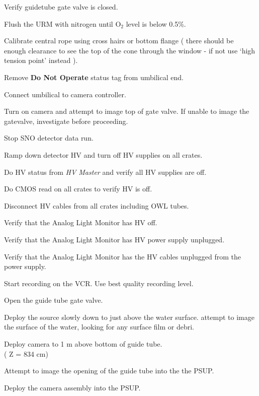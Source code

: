 \begin{enumerate}

\checkitem Verify guidetube gate valve is closed.

\checkitem Flush the URM with nitrogen until O$_2$ level is below
  0.5\%.

\checkitem Calibrate central rope using cross hairs or bottom flange
           ( there should be enough clearance to see the top of the
           cone through the window - if not use `high tension point'
           instead ).

\checkitem Remove {\bf Do Not Operate} status tag from umbilical end.

\checkitem Connect umbilical to camera controller.

\checkitem Turn on camera and attempt to image top of gate valve.  If unable
  to image the gatevalve, investigate before proceeding.

\checkitem Stop SNO detector data run.

\checkitem Ramp down detector HV and turn off HV supplies on all 
  crates.

\checkitem Do HV status from {\em HV Master} and verify all HV supplies
  are off.

\checkitem Do CMOS read on all crates to verify HV is off.

\checkitem Disconnect HV cables from all crates including OWL tubes.

\checkitem Verify that the Analog Light Monitor has HV off.

\checkitem Verify that the Analog Light Monitor has HV power supply
  unplugged.

\checkitem Verify that the Analog Light Monitor has the HV cables unplugged
  from the power supply.

\checkitem Start recording on the VCR.  Use best quality recording
  level.

\checkitem Open the guide tube gate valve.

\checkitem Deploy the source slowly down to just above the water
  surface.  attempt to image the surface of the water, looking
  for any surface film or debri.

\checkitem Deploy camera to 1 m above bottom of guide tube.\\
  ( Z = 834 cm)

\checkitem Attempt to image the opening of the guide tube into the
  the PSUP.  

\checkitem Deploy the camera assembly into the PSUP.
  

\end{enumerate}
